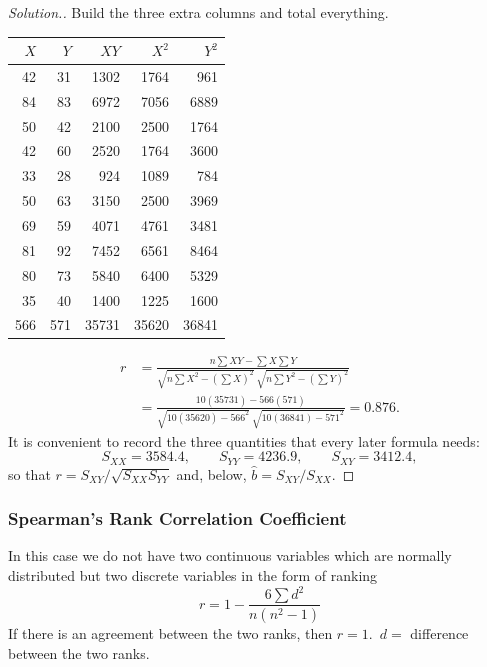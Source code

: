 \documentclass[11pt,a4paper]{article}
\theoremstyle{definition}
\newenvironment{solution}
  {\renewcommand{\qedsymbol}{}\begin{proof}[\textit{Solution}.]}
  {\end{proof}}
\begin{document}
\begin{solution}
Build the three extra columns and total everything.
\begin{table}[H]
\centering
\begin{tabular}{rrrrr}
$X$ & $Y$ & $XY$ & $X^2$ & $Y^2$\\
\hline
42 & 31 & 1302 & 1764 & 961\\
84 & 83 & 6972 & 7056 & 6889\\
50 & 42 & 2100 & 2500 & 1764\\
42 & 60 & 2520 & 1764 & 3600\\
33 & 28 & 924  & 1089 & 784\\
50 & 63 & 3150 & 2500 & 3969\\
69 & 59 & 4071 & 4761 & 3481\\
81 & 92 & 7452 & 6561 & 8464\\
80 & 73 & 5840 & 6400 & 5329\\
35 & 40 & 1400 & 1225 & 1600\\
\hline
566 & 571 & 35731 & 35620 & 36841\\
\end{tabular}
\end{table}
\begin{align*}
r&=\frac{n\sum XY-\sum X\sum Y}
{\sqrt{n\sum X^2-\left(\sum X\right)^2}\ \sqrt{n\sum Y^2-\left(\sum Y\right)^2}}\\
&=\frac{10(35731)-566(571)}{\sqrt{10(35620)-566^2}\ \sqrt{10(36841)-571^2}}=0.876.
\end{align*}
It is convenient to record the three quantities that every later formula needs:
\[S_{XX}=3584.4,\qquad S_{YY}=4236.9,\qquad S_{XY}=3412.4,\]
so that $r=S_{XY}/\sqrt{S_{XX}S_{YY}}$ and, below, $\hat{b}=S_{XY}/S_{XX}$.
\end{solution}






\pagebreak
\subsubsection{Spearman's Rank Correlation Coefficient}
In this case we do not have two continuous variables which are normally distributed but two discrete variables in the form of ranking \[r=1-\frac{6\sum d^2}{n(n^2-1)}\]
If there is an agreement between the two ranks, then $r=1$.\  $d=$ difference between the two ranks.\\
\end{document}
